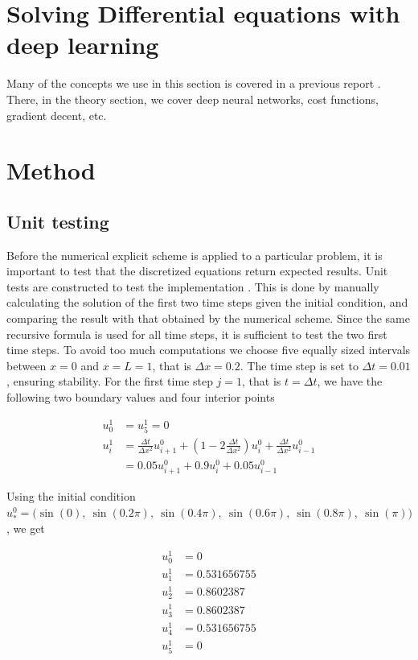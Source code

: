 \documentclass[12pt]{extarticle}
\begin{document}
\section{Solving Differential equations with deep learning}
Many of the concepts we use in this section is covered in a previous report \cite{project2}. There, in the theory section, we cover deep neural networks, cost functions, gradient decent, etc. 

\section{Method}
\subsection*{Unit testing}
Before the numerical explicit scheme is applied to a particular problem, it is important to test that the discretized equations return expected results. Unit tests are constructed to test the implementation . This is done by manually calculating the solution of the first two time steps given the initial condition, and comparing the result with that obtained by the numerical scheme. Since the same recursive formula is used for all time steps, it is sufficient to test the two first time steps. To avoid too much computations we choose five equally sized intervals between $x=0$ and $x=L=1$, that is $\Delta x = 0.2$. The time step is set to $\Delta t = 0.01$, ensuring stability.
For the first time step $j=1$, that is $t=\Delta t$, we have the following two boundary values and four interior points

\begin{align*}
	u_0^1 &= u_5^1 = 0 \\
	u_i^1 &= \frac{\Delta t}{\Delta x^2}u_{i+1}^0 + (1 - 2\frac{\Delta t}{\Delta x^2})u_i^0 + \frac{\Delta t}{\Delta x^2}u_{i-1}^0 \\
	&= 0.05u_{i+1}^0 + 0.9u_i^0 + 0.05u_{i-1}^0
\end{align*}

Using the initial condition $u_*^0 = \big(\sin(0),\:\sin(0.2\pi),\:\sin(0.4\pi),\:\sin(0.6\pi), \:\sin(0.8\pi),\:\sin(\pi)\big)$, we get

\begin{align*}
	u_0^1 &= 0 \\
	u_1^1 &= 0.531656755 \\
	u_2^1 &= 0.8602387 \\
	u_3^1 &= 0.8602387 \\
	u_4^1 &= 0.531656755 \\
	u_5^1 &= 0
\end{align*}
\end{document}
